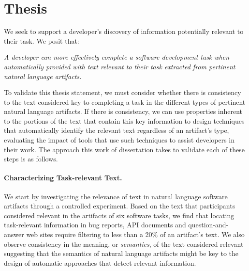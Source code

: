 

\section{Thesis}
\label{cp1:thesis}





We seek to support a developer's discovery of information potentially relevant to their task. 
We posit that:

\medskip
\begin{bluequote}
    \textit{A developer can more effectively complete a software development task when automatically provided with text relevant to their task extracted from pertinent natural language artifacts.}
\end{bluequote}
\medskip




To validate this thesis statement, 
we must consider whether there is consistency to 
the text 
considered key to completing a task
in the different types of pertinent natural language artifacts.
If there is consistency, we can use properties inherent 
to the portions of the text that contain this key information 
to design techniques that automatically identify the relevant text
regardless of an artifact's type, evaluating the impact of tools that use such techniques to assist developers in their work. 
The approach this work of dissertation takes to validate each of these steps is as follows.





\paragraph{\textbf{Characterizing Task-relevant Text.}} 


We start by investigating the relevance of text in natural language software artifacts
through a controlled experiment.
Based on the text that participants considered relevant in the artifacts of six software tasks,
we find that 
locating task-relevant information in bug
reports, API documents and question-and-answer web sites require filtering
to less than a 20\% of an artifact's text.
We also 
observe consistency in the meaning, or \textit{semantics}, of the
 text considered relevant
 suggesting that the semantics of natural language artifacts might 
 be key to the design of automatic approaches that detect relevant information.



